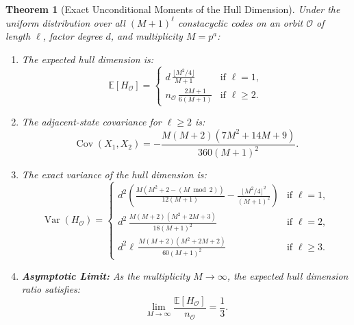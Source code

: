 \documentclass[preprint,12pt]{elsarticle}
\newcommand{\Var}{\operatorname{Var}}
\newcommand{\Cov}{\operatorname{Cov}}
\numberwithin{equation}{section}
\theoremstyle{plain}
\newtheorem{theorem}{Theorem}[section]
\theoremstyle{definition}
\theoremstyle{remark}
\begin{document}
\begin{theorem}[Exact Unconditional Moments of the Hull Dimension]\label{thm:moments}
Under the uniform distribution over all $(M+1)^\ell$ constacyclic codes on an orbit $\mathcal{O}$ of length $\ell$, factor degree $d$, and multiplicity $M = p^a$:
\begin{enumerate}
    \item The expected hull dimension is:
    \begin{equation}\label{eq:mean_hull}
        \mathbb{E}[H_{\mathcal{O}}] = \begin{cases}
            d \, \frac{\lfloor M^2 / 4 \rfloor}{M + 1} & \text{if } \ell = 1, \\[6pt]
            n_{\mathcal{O}} \, \frac{2M + 1}{6(M + 1)} & \text{if } \ell \ge 2.
        \end{cases}
    \end{equation}
    \item The adjacent-state covariance for $\ell \ge 2$ is:
    \begin{equation}\label{eq:covariance}
        \Cov(X_1, X_2) = -\frac{M(M + 2)(7M^2 + 14M + 9)}{360(M + 1)^2}.
    \end{equation}
    \item The exact variance of the hull dimension is:
    \begin{equation}\label{eq:variance}
        \Var(H_{\mathcal{O}}) = \begin{cases}
            d^2 \left( \frac{M(M^2 + 2 - (M \bmod 2))}{12(M+1)} - \frac{\lfloor M^2/4 \rfloor^2}{(M+1)^2} \right) & \text{if } \ell = 1, \\[8pt]
            d^2 \, \frac{M(M + 2)(M^2 + 2M + 3)}{18(M + 1)^2} & \text{if } \ell = 2, \\[8pt]
            d^2 \ell \, \frac{M(M + 2)(M^2 + 2M + 2)}{60(M + 1)^2} & \text{if } \ell \ge 3.
        \end{cases}
    \end{equation}
    \item \textbf{Asymptotic Limit:} As the multiplicity $M \to \infty$, the expected hull dimension ratio satisfies:
    \begin{equation}
        \lim_{M \to \infty} \frac{\mathbb{E}[H_{\mathcal{O}}]}{n_{\mathcal{O}}} = \frac{1}{3}.
    \end{equation}
\end{enumerate}
\end{theorem}
\end{document}
